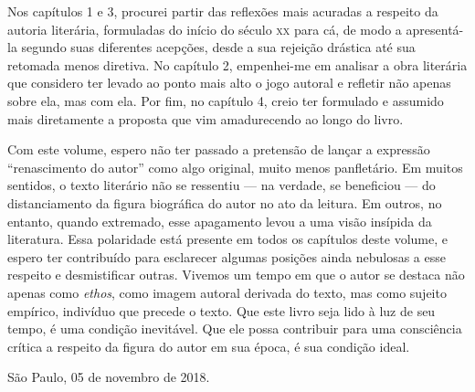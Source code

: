 Nos capítulos 1 e 3, procurei partir das reflexões mais acuradas a respeito da autoria literária, formuladas do início do século \textsc{xx} para cá, de modo a apresentá-la segundo suas diferentes acepções, desde a sua rejeição drástica até sua retomada menos diretiva. No capítulo 2, empenhei-me em analisar a obra literária que considero ter levado ao ponto mais alto o jogo autoral e refletir não apenas sobre ela, mas com ela. Por fim, no capítulo 4, creio ter formulado e assumido mais diretamente a proposta que vim amadurecendo ao longo do livro. 

Com este volume, espero não ter passado a pretensão de lançar a expressão ``renascimento do autor'' como algo original, muito menos panfletário. Em muitos sentidos, o texto literário não se ressentiu --- na verdade, se beneficiou --- do distanciamento da figura biográfica do autor no ato da leitura. Em outros, no entanto, quando extremado, esse apagamento levou a uma visão insípida da literatura. Essa polaridade está presente em todos os capítulos deste volume, e espero ter contribuído para esclarecer algumas posições ainda nebulosas a esse respeito e desmistificar outras. Vivemos um tempo em que o autor se destaca não apenas como \emph{ethos}, como imagem autoral derivada do texto, mas como sujeito empírico, indivíduo que precede o texto. Que este livro seja lido à luz de seu tempo, é uma condição inevitável. Que ele possa contribuir para uma consciência crítica a respeito da figura do autor em sua época, é sua condição ideal. 

\begin{flushright}
São Paulo, 05 de novembro de 2018.
\end{flushright}